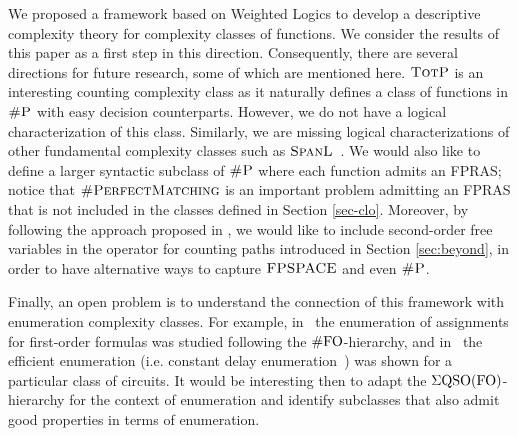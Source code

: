 
We proposed a framework based on Weighted Logics to develop a descriptive complexity theory for complexity classes of functions.
We consider the results of this paper as a first step in this direction.
Consequently, there are several directions for future research, some of which are mentioned here. 
$\text{\sc TotP}$ is an interesting counting complexity class as it naturally defines a class of functions in $\text{\sc \#P}$ with easy decision counterparts. However, we do not have a logical characterization of this class.
Similarly, we are missing logical characterizations of other fundamental complexity classes such as $\text{\sc SpanL}$~\cite{AlvarezJ93}. We would also like to define a larger syntactic subclass of $\text{\sc \#P}$ where each function admits an FPRAS; notice that $\textsc{\#PerfectMatching}$ is an important problem admitting an FPRAS\cite{JSV04} that is not included in the classes defined in Section \ref{sec-clo}. Moreover, by following the approach proposed in
\cite{I83}, we would like to include second-order free variables in the operator for counting paths introduced in Section \ref{sec:beyond}, in order to have alternative ways to capture $\text{\sc FPSPACE}$ and even $\text{\sc \#P}$. 

Finally, an open problem is to understand the connection of this framework with enumeration complexity classes. For example, in~\cite{durandS11} the enumeration of assignments for first-order formulas was studied following the $\#{\rm FO}$-hierarchy, and in~\cite{AmarilliBJM17} the efficient enumeration (i.e. constant delay enumeration~\cite{Segoufin13}) was shown for a particular class of circuits. It would be interesting then to adapt the $\Sigma{\rm QSO}({\rm FO})$-hierarchy for the context of enumeration and identify subclasses that also admit good properties in terms of enumeration.

